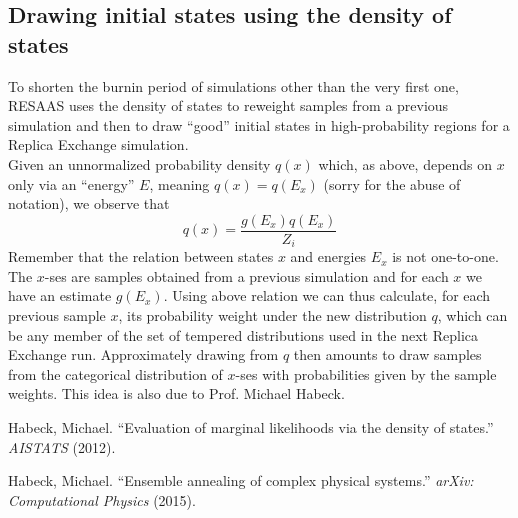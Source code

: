 \documentclass{article}
\begin{document}
\subsection*{Drawing initial states using the density of states}
To shorten the burnin period of simulations other than the very first one, RESAAS uses the density of states to reweight samples from a previous simulation and then to draw ``good'' initial states in high-probability regions for a Replica Exchange simulation.\\
Given an unnormalized probability density $q(x)$ which, as above, depends on $x$ only via an ``energy'' $E$, meaning $q(x) = q(E_x)$ (sorry for the abuse of notation), we observe that
\begin{equation*}
  q(x) = \frac{g(E_x)q(E_x)}{Z_i}
\end{equation*}
Remember that the relation between states $x$ and energies $E_x$ is not one-to-one. The $x$-ses are samples obtained from a previous simulation and for each $x$ we have an estimate $g(E_x)$. Using above relation we can thus calculate, for each previous sample $x$, its probability weight under the new distribution $q$, which can be any member of the set of tempered distributions used in the next Replica Exchange run. Approximately drawing from $q$ then amounts to draw samples from the categorical distribution of $x$-ses with probabilities given by the sample weights. This idea is also due to Prof. Michael Habeck\cite{habeck_ensemble_annealing}.
\begin{thebibliography}{9}
Habeck, Michael. “Evaluation of marginal likelihoods via the density of states.” \textit{AISTATS} (2012).

Habeck, Michael. “Ensemble annealing of complex physical systems.” \textit{arXiv: Computational Physics} (2015). 
\end{thebibliography}
\end{document}

